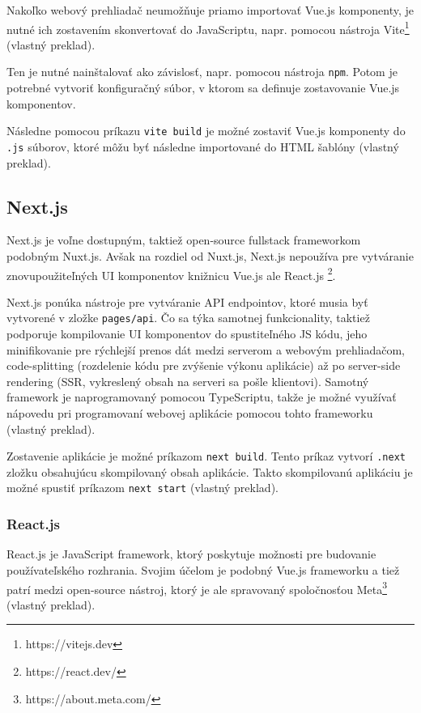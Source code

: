 Nakoľko webový prehliadač neumožňuje priamo importovať Vue.js komponenty, je nutné ich zostavením skonvertovať do JavaScriptu, napr. pomocou nástroja Vite\footnote{https://vitejs.dev} \cite{vuejs_introduction} (vlastný preklad).

Ten je nutné nainštalovať ako závislosť, napr. pomocou nástroja \texttt{npm}. Potom je potrebné vytvoriť konfiguračný súbor, v ktorom sa definuje zostavovanie Vue.js komponentov.

Následne pomocou príkazu \texttt{vite build} je možné zostaviť Vue.js komponenty do \texttt{.js} súborov, ktoré môžu byť následne importované do HTML šablóny \cite{vuejs_introduction} (vlastný preklad).

\subsection {Next.js}
Next.js je voľne dostupným, taktiež open-source fullstack frameworkom podobným Nuxt.js. Avšak na rozdiel od Nuxt.js, Next.js nepoužíva pre vytváranie znovupoužiteľných UI komponentov knižnicu Vue.js ale React.js \footnote{https://react.dev/}.

Next.js ponúka nástroje pre vytváranie API endpointov, ktoré musia byť vytvorené v zložke \texttt{pages/api}. Čo sa týka samotnej funkcionality, taktiež podporuje kompilovanie UI komponentov do spustiteľného JS kódu, jeho minifikovanie pre rýchlejší prenos dát medzi serverom a webovým prehliadačom, code-splitting (rozdelenie kódu pre zvýšenie výkonu aplikácie) až po server-side rendering (SSR, vykreslený obsah na serveri sa pošle klientovi). Samotný framework je naprogramovaný pomocou TypeScriptu, takže je možné využívať nápovedu pri programovaní webovej aplikácie pomocou tohto frameworku \cite{nextjs_introduction} (vlastný preklad).

Zostavenie aplikácie je možné príkazom \texttt{next build}. Tento príkaz vytvorí \texttt{.next} zložku obsahujúcu skompilovaný obsah aplikácie. Takto skompilovanú aplikáciu je možné spustiť príkazom \texttt{next start} \cite{nextjs_introduction} (vlastný preklad). 

\subsubsection {React.js}
React.js je JavaScript framework, ktorý poskytuje možnosti pre budovanie používateľského rozhrania. Svojim účelom je podobný Vue.js frameworku a tiež patrí medzi open-source nástroj, ktorý je ale spravovaný spoločnosťou Meta\footnote{https://about.meta.com/} \cite{about_react} (vlastný preklad).

